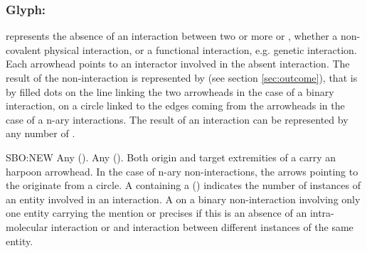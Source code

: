 \color{red}

\subsubsection{Glyph: }\label{sec:non-interaction}

 represents the absence of an interaction between two or more  or , whether a non-covalent physical interaction, or a functional interaction, e.g. genetic interaction. Each arrowhead points to an interactor involved in the absent interaction. The result of the non-interaction is represented by  (see section \ref{sec:outcome}), that is by filled dots on the line linking the two arrowheads in the case of a binary interaction, on a circle linked to the edges coming from the arrowheads in the case of a  n-ary interactions. The result of an interaction can be represented by any number of .

\begin{glyphDescription}
 \glyphSboTerm SBO:NEW
 \glyphOrigin Any  ().
 \glyphTarget Any  ().
 \glyphEndPoint Both origin and target extremities of a  carry an harpoon arrowhead. In the case of n-ary non-interactions, the arrows pointing to the  originate from a circle. 
 \glyphAux A  containing a  () indicates the number of instances of an entity involved in an interaction. A  on a binary non-interaction involving only one entity carrying the mention  or  precises if this is an absence of an intra-molecular interaction or and interaction between different instances of the same entity.
 \end{glyphDescription}

